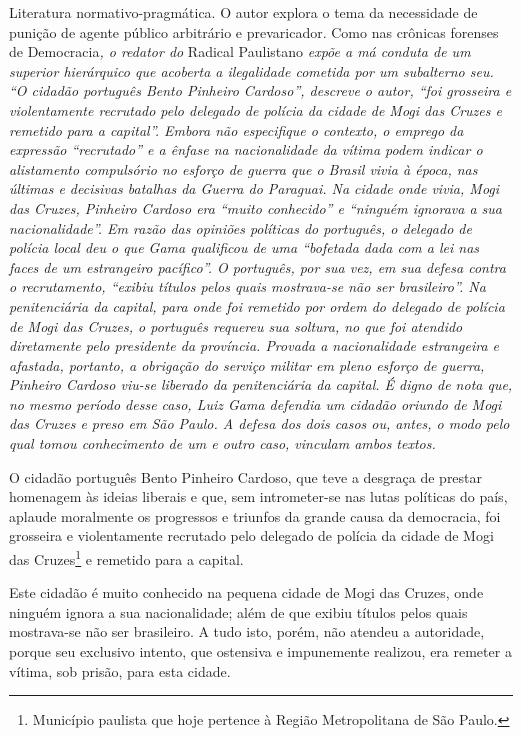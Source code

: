 \begin{didascalia}
Literatura normativo-pragmática. O autor explora o tema da necessidade
de punição de agente público arbitrário e prevaricador. Como nas
crônicas forenses de Democracia\emph{, o redator do} Radical Paulistano
\emph{expõe a má conduta de um superior hierárquico que acoberta a
ilegalidade cometida por um subalterno seu. ``O cidadão português Bento
Pinheiro Cardoso'', descreve o autor, ``foi grosseira e violentamente
recrutado pelo delegado de polícia da cidade de Mogi das Cruzes e
remetido para a capital''. Embora não especifique o contexto, o emprego
da expressão ``recrutado'' e a ênfase na nacionalidade da vítima podem
indicar o alistamento compulsório no esforço de guerra que o Brasil
vivia à época, nas últimas e decisivas batalhas da Guerra do Paraguai.
Na cidade onde vivia, Mogi das Cruzes, Pinheiro Cardoso era ``muito
conhecido'' e ``ninguém ignorava a sua nacionalidade''. Em razão das
opiniões políticas do português, o delegado de polícia local deu o que
Gama qualificou de uma ``bofetada dada com a lei nas faces de um
estrangeiro pacífico''. O português, por sua vez, em sua defesa contra o
recrutamento, ``exibiu títulos pelos quais mostrava-se não ser
brasileiro''. Na penitenciária da capital, para onde foi remetido por
ordem do delegado de polícia de Mogi das Cruzes, o português requereu
sua soltura, no que foi atendido diretamente pelo presidente da
província. Provada a nacionalidade estrangeira e afastada, portanto, a
obrigação do serviço militar em pleno esforço de guerra, Pinheiro
Cardoso viu-se liberado da penitenciária da capital. É digno de nota
que, no mesmo período desse caso, Luiz Gama defendia um cidadão oriundo
de Mogi das Cruzes e preso em São Paulo. A defesa dos dois casos ou,
antes, o modo pelo qual tomou conhecimento de um e outro caso, vinculam
ambos textos.}
\end{didascalia}



O cidadão português Bento Pinheiro Cardoso, que teve a desgraça de
prestar homenagem às ideias liberais e que, sem intrometer-se nas lutas
políticas do país, aplaude moralmente os progressos e triunfos da grande
causa da democracia, foi grosseira e violentamente recrutado pelo
delegado de polícia da cidade de Mogi das Cruzes\footnote{Município
  paulista que hoje pertence à Região Metropolitana de São Paulo.} e
remetido para a capital.

Este cidadão é muito conhecido na pequena cidade de Mogi das Cruzes,
onde ninguém ignora a sua nacionalidade; além de que exibiu títulos
pelos quais mostrava-se não ser brasileiro. A tudo isto, porém, não
atendeu a autoridade, porque seu exclusivo intento, que ostensiva e
impunemente realizou, era remeter a vítima, sob prisão, para esta
cidade.

